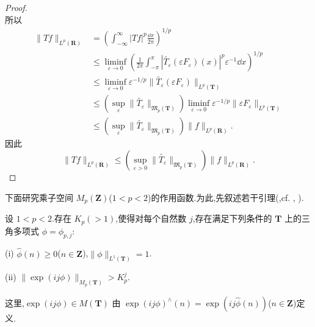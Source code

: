 \begin{proof}
\begin{equation*}
\end{equation*}
所以
\begin{align*}
\|Tf\|_{L^{p}(\mathbf{R})} &= \left(\int_{-\infty}^{\infty}|Tf|^{p}\frac{\dd x}{2\pi}\right)^{1/p}\\
&\leq \liminf_{\varepsilon \to 0}\left(\frac{1}{2\pi}\int_{-\pi}^{\pi}\left|\widetilde{T_{\varepsilon}}(\varepsilon F_{\varepsilon})(x)\right|^{p}\varepsilon^{-1}\dd x\right)^{1/p}\\
&\leq \liminf_{\varepsilon \to 0}\varepsilon^{-1/p}\|\widetilde{T_{\varepsilon}}(\varepsilon F_{\varepsilon})\|_{L^{p}(\mathbf{T})}\\
&\leq \left(\sup_{\varepsilon}\|\widetilde{T_{\varepsilon}}\|_{\mathfrak{M}_{p}(\mathbf{T})}\right)\liminf_{\varepsilon \to 0}\varepsilon^{-1/p}\|\varepsilon F_{\varepsilon}\|_{L^{p}(\mathbf{T})}\\
&\leq \left(\sup_{\varepsilon}\|\widetilde{T_{\varepsilon}}\|_{\mathfrak{M}_{p}(\mathbf{T})}\right)\|f\|_{L^{p}(\mathbf{R})}.
\end{align*}
因此
\begin{equation*}
\|Tf\|_{L^{p}(\mathbf{R})} \leq \left(\sup_{\varepsilon > 0}\|\widetilde{T_{\varepsilon}}\|_{\mathfrak{M}_{p}(\mathbf{T})}\right)\|f\|_{L^{p}(\mathbf{R})}.
\end{equation*}
\end{proof}

下面研究乘子空间 $M_{p}(\mathbf{Z})$($1 < p < 2$)的作用函数.为此,先叙述若干引理(\cite{ch3:24},cf. \cite{ch3:43}, \cite{ch3:48}).

\begin{lemma}\label{lem:3.5.20}
设 $1 < p < 2$.存在 $K_{p}(>1)$,使得对每个自然数 $j$,存在满足下列条件的 $\mathbf{T}$ 上的三角多项式 $\phi = \phi_{p,j}$:

(i) $\widehat{\phi}(n) \geq 0$($n \in \mathbf{Z}$),$\|\phi\|_{L^1(\mathbf{T})} = 1$.

(ii) $\|\exp(ij\phi)\|_{M_p(\mathbf{T})} > K_p^j$.

这里,$\exp(ij\phi) \in M(\mathbf{T})$ 由 $\exp(ij\phi)^{\wedge}(n) = \exp(ij\widehat{\phi}(n))$($n \in \mathbf{Z}$)定义.
\end{lemma}

